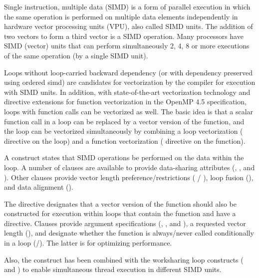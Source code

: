 \label{chap:simd}

Single instruction, multiple data (SIMD) is a form of parallel execution 
in which the same operation is performed on multiple data elements 
independently in hardware vector processing units (VPU), also called SIMD units.
The addition of two vectors to form a third vector is a SIMD operation.
Many processors have SIMD (vector) units that can perform simultaneously 
2, 4, 8 or more executions of the same operation (by a single SIMD unit). 

Loops without loop-carried backward dependency (or with dependency preserved using 
ordered simd) are candidates for vectorization by the compiler for 
execution with SIMD units. In addition, with state-of-the-art vectorization 
technology and  directive extensions for function vectorization
in the OpenMP 4.5 specification, loops with function calls can be vectorized as well. 
The basic idea is that a scalar function call in a loop can be replaced by a vector version 
of the function, and the loop can be vectorized simultaneously by combining a loop 
vectorization ( directive on the loop) and a function 
vectorization ( directive on the function).

A  construct states that SIMD operations be performed on the
data within the loop.  A number of clauses are available to provide
data-sharing attributes (, ,  and 
).  Other clauses provide vector length preference/restrictions 
( / ), loop fusion (), and data 
alignment ().

The  directive designates
that a vector version of the function should also be constructed for 
execution within loops that contain the function and have a  
directive.  Clauses provide argument specifications (,
, and ), a requested vector length 
(), and designate whether the function is always/never 
called conditionally in a loop (/). 
The latter is for optimizing performance.

Also, the  construct has been combined with the worksharing loop 
constructs ( and ) to enable simultaneous thread 
execution in different SIMD units.  






